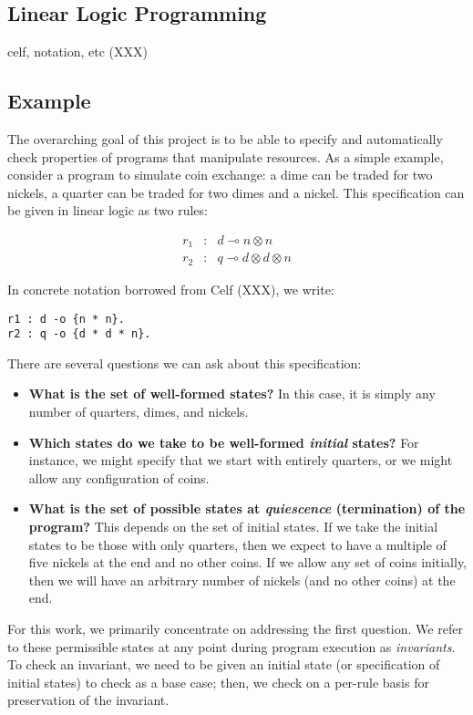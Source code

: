 \documentclass[fullpage, 11pt]{article}
\newcommand{\lolli}{\multimap}
\newcommand{\tensor}{\otimes}
\begin{document}
\subsection{Linear Logic Programming}

celf, notation, etc (XXX)


\subsection{Example}

The overarching goal of this project is to be able to specify and
automatically check properties of programs that manipulate resources.
As a simple example, consider a program to simulate coin exchange: a dime
can be traded for two nickels, a quarter can be traded for two dimes and a
nickel. %
This specification can be given in linear logic as two rules:

\begin{eqnarray*}
r_1 &:& d \lolli n \tensor n\\
r_2 &:& q \lolli d \tensor d \tensor n
\end{eqnarray*}

In concrete notation borrowed from Celf (XXX), we write:
\begin{verbatim}
r1 : d -o {n * n}.
r2 : q -o {d * d * n}.
\end{verbatim}

There are several questions we can ask about this specification:
\begin{itemize}
\item {\bf What is the set of well-formed states?} In this case, it is simply any
number of quarters, dimes, and nickels.
\item {\bf Which states do we take to be well-formed {\em initial} states?} For
  instance, we might specify that we start with entirely quarters, or we
  might allow any configuration of coins.
\item {\bf What is the set of possible states at {\em quiescence} (termination)
  of the program?} This depends on the set of initial states. If we take the
  initial states to be those with only quarters, then we expect to have a
  multiple of five nickels at the end and no other coins. If we allow any
  set of coins initially, then we will have an arbitrary number of nickels
  (and no other coins) at the end.
\end{itemize}

For this work, we primarily concentrate on addressing the first
question. We refer to these permissible states at any point during program
execution as {\em invariants}. To check an invariant, we need to be given
an initial state (or specification of initial states) to check as a base
case; then, we check on a per-rule basis for preservation of the invariant.
\end{document}
